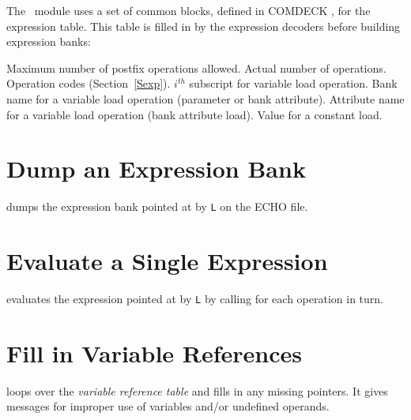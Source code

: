 The ~module uses a set of common blocks,
defined in COMDECK , for the expression table.
This table is filled in by the expression decoders before building
expression banks:
\begin{mylist}
Maximum number of postfix operations allowed.
Actual number of operations.
Operation codes (Section~\ref{Sexp}).
$i^{th}$ subscript for variable load operation.
Bank name for a variable load operation (parameter or bank attribute).
Attribute name for a variable load operation (bank attribute load).
Value for a constant load.
\end{mylist}

\section{Dump an Expression Bank}
\label{EXDUMP}
dumps the expression bank pointed at by {\tt L} on the ECHO file.

\section{Evaluate a Single Expression}
\label{EXEVAL}
evaluates the expression pointed at by {\tt L} by calling
 for each operation in turn.

\section{Fill in Variable References}
\label{EXFILL}
loops over the {\em variable reference table}
 and fills in any missing pointers.
It gives messages for improper use of variables and/or undefined
operands.

